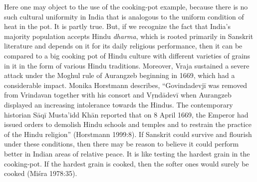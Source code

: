 Here one may object to the use of the cooking-pot example, because there is no such cultural uniformity in India that is analogous to the uniform condition of heat in the pot. It is partly true. But, if we recognize the fact that India’s majority population accepts Hindu {\sl dharma}, which is rooted primarily in Sanskrit literature and depends on it for its daily religious performance, then it can be compared to a big cooking pot of Hindu culture with different varieties of grains in it in the form of various Hindu traditions. Moreover, Vraja sustained a severe attack under the Moghul rule of Aurangzeb beginning in 1669, which had a considerable impact. Monika Horstmann describes, “Govindadevjī was removed from Vrindavan together with his consort and Vṛndādevī when Aurangzeb displayed an increasing intolerance towards the Hindus. The contemporary historian Sāqī Musta’idd Khān reported that on 8 April 1669, the Emperor had issued orders to demolish Hindu schools and temples and to restrain the practice of the Hindu religion” (Horstmann 1999:8). If Sanskrit could survive and flourish under these conditions, then there may be reason to believe it could perform better in Indian areas of relative peace. It is like testing the hardest grain in the cooking-pot. If the hardest grain is cooked, then the softer ones would surely be cooked (Miśra 1978:35). 

